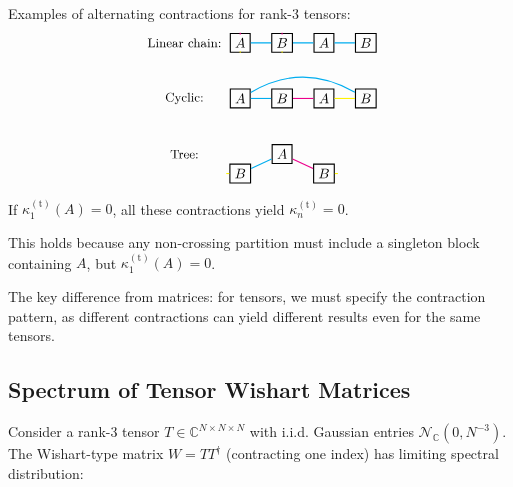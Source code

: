 Examples of alternating contractions for rank-3 tensors:
\[
\begin{tikzpicture}[baseline=0, scale=0.7]
   \node at (-2,1) {\small Linear chain:};
   \node[draw, thick] (A1) at (0,1) {$A$};
   \node[draw, thick] (B1) at (1.5,1) {$B$};
   \node[draw, thick] (A2) at (3,1) {$A$};
   \node[draw, thick] (B2) at (4.5,1) {$B$};
   \draw[cyan, thick] (A1) -- (B1) -- (A2) -- (B2);
   \draw[magenta, thick] (A1) -- ++(0,.3);
   \draw[yellow, thick] (A1) -- ++(0,-.3);
   \draw[magenta, thick] (B1) -- ++(0,.3);
   \draw[yellow, thick] (B1) -- ++(0,-.3);
   
   \node at (-2,-1) {\small Cyclic:};
   \node[draw, thick] (A3) at (0,-1) {$A$};
   \node[draw, thick] (B3) at (1.5,-1) {$B$};
   \node[draw, thick] (A4) at (3,-1) {$A$};
   \node[draw, thick] (B4) at (4.5,-1) {$B$};
   \draw[cyan, thick] (A3) -- (B3);
   \draw[magenta, thick] (B3) -- (A4);
   \draw[yellow, thick] (A4) -- (B4);
   \draw[cyan, thick] (B4) to[bend right=30] (A3);
   
   \node at (-2,-3) {\small Tree:};
   \node[draw, thick] (A5) at (1.5,-3) {$A$};
   \node[draw, thick] (B5) at (0,-3.7) {$B$};
   \node[draw, thick] (B6) at (3,-3.7) {$B$};
   \draw[cyan, thick] (A5) -- (B5);
   \draw[magenta, thick] (A5) -- (B6);
   \draw[yellow, thick] (B5) -- ++(-.5,0);
   \draw[yellow, thick] (B6) -- ++(.5,0);
\end{tikzpicture}
\]

If $\kappa_1^{(\mathrm{t})}(A) = 0$, all these contractions yield $\kappa_n^{(\mathrm{t})} = 0$.

This holds because any non-crossing partition must include a singleton block containing $A$, but $\kappa_1^{(\mathrm{t})}(A) = 0$.

The key difference from matrices: for tensors, we must specify the contraction pattern, as different contractions can yield different results even for the same tensors.

\subsection{Spectrum of Tensor Wishart Matrices}

Consider a rank-3 tensor $T \in \mathbb{C}^{N \times N \times N}$ with i.i.d. Gaussian entries $\mathcal{N}_{\mathbb{C}}(0, N^{-3})$. The Wishart-type matrix $W = TT^{\dagger}$ (contracting one index) has limiting spectral distribution:

